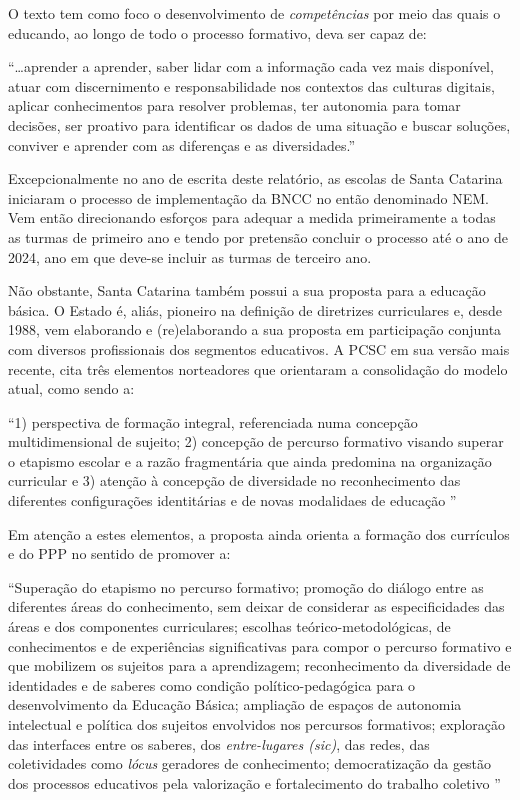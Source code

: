 O texto tem como foco o desenvolvimento de \emph{competências} por meio das quais o educando, ao longo de todo o processo formativo, deva ser capaz de:

\begin{citacao}
    ``\ldots aprender a aprender, saber lidar com a informação cada vez mais disponível, atuar com discernimento e responsabilidade nos contextos das culturas digitais, aplicar conhecimentos para resolver problemas, ter autonomia para tomar decisões, ser proativo para identificar os dados de uma situação e buscar soluções, conviver e aprender com as diferenças e as diversidades.'' 
\end{citacao}
Excepcionalmente no ano de escrita deste relatório, as escolas de Santa Catarina iniciaram o processo de implementação da \ac{BNCC} no então denominado \ac{NEM}. Vem então direcionando esforços para adequar a medida primeiramente a todas as turmas de primeiro ano e tendo por pretensão concluir o processo até o ano de 2024, ano em que deve-se incluir as turmas de terceiro ano.

Não obstante, Santa Catarina também possui a sua proposta para a educação básica. O Estado é, aliás, pioneiro na definição de diretrizes curriculares e, desde 1988, vem elaborando e (re)elaborando a sua proposta em participação conjunta com diversos profissionais dos segmentos educativos. A \ac{PCSC} em sua versão mais recente, cita três elementos norteadores que orientaram a consolidação do modelo atual, como sendo a:

\begin{citacao}
    ``1) perspectiva de formação integral, referenciada numa concepção multidimensional de sujeito; 2) concepção de percurso formativo visando superar o etapismo escolar e a razão fragmentária que ainda predomina na organização curricular e 3) atenção à concepção de diversidade no reconhecimento das diferentes configurações identitárias e de novas modalidaes de educação \cite[p.~20]{PCSC:2014}''
\end{citacao}
Em atenção a estes elementos, a proposta ainda orienta a formação dos currículos e do \ac{PPP} no sentido de promover a:

\begin{citacao}
    ``Superação do etapismo no percurso formativo; promoção do diálogo entre as diferentes áreas do conhecimento, sem deixar de considerar as especificidades das áreas e dos componentes curriculares; escolhas teórico-metodológicas, de conhecimentos e de experiências significativas para compor o percurso formativo e que mobilizem os sujeitos para a aprendizagem; reconhecimento da diversidade de identidades e de saberes como condição político-pedagógica para o desenvolvimento da Educação Básica; ampliação de espaços de autonomia intelectual e política dos sujeitos envolvidos nos percursos formativos; exploração das interfaces entre os saberes, dos \emph{entre-lugares (sic)}, das redes, das coletividades como \emph{lócus} geradores de conhecimento; democratização da gestão dos processos educativos pela valorização e fortalecimento do trabalho coletivo ''
\end{citacao}

